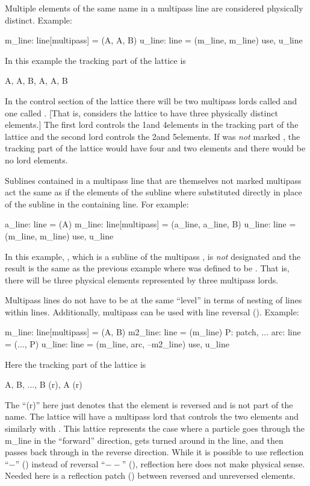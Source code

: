 Multiple elements of the same name in a multipass line are considered 
physically distinct. Example:
\begin{example}
  m_line: line[multipass] = (A, A, B)
  u_line: line = (m_line, m_line)
  use, u_line
\end{example}
In this example the tracking part of the lattice is
\begin{example}
  A, A, B, A, A, B
\end{example}
In the control section of the lattice there will be two multipass lords called  and one called
. [That is, \bmad considers the lattice to have three physically distinct elements.] The first
 lord controls the 1\St and 4\Th elements in the tracking part of the lattice and the second
 lord controls the 2\Nd and 5\Th elements. If  was {\em not} marked ,
the tracking part of the lattice would have four  and two  elements and there would be
no lord elements.

Sublines contained in a multipass line that are themselves not marked multipass act the same as if
the elements of the subline where substituted directly in place of the subline in the containing
line. For example:
\begin{example}
  a_line: line = (A)
  m_line: line[multipass] = (a_line, a_line, B)
  u_line: line = (m_line, m_line)
  use, u_line
\end{example}
In this example, , which is a subline of the multipass , is {\em not}
designated  and the result is the same as the previous example where  was
defined to be . That is, there will be three physical elements represented by three
multipass lords.

Multipass lines do not have to be at the same ``level'' in terms of nesting of lines within
lines. Additionally, multipass can be used with line reversal (). Example:
\begin{example}
  m_line: line[multipass] = (A, B)
  m2_line: line = (m_line)
  P: patch, ...
  arc: line = (..., P)
  u_line: line = (m_line, arc, --m2_line)
  use, u_line
\end{example}
Here the tracking part of the lattice is
\begin{example}
  A, B, ..., B (r), A (r)
\end{example}
The ``(r)'' here just denotes that the element is reversed and is not part of the name. The lattice
will have a multipass lord  that controls the two  elements and similarly with
. This lattice represents the case where a particle goes through the m_line in the ``forward''
direction, gets turned around in the  line, and then passes back through  in the
reverse direction.  While it is possible to use reflection ``$-$'' () instead
of reversal ``$--$'' (), reflection here does not make physical sense.  Needed
here is a reflection patch  () between reversed and unreversed elements.


